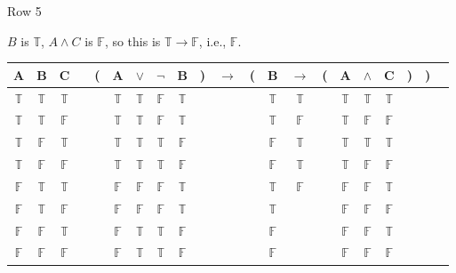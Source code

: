 \documentclass[
  ignorenonframetext,
]{beamer}
\renewcommand{\,}{\text{, }}
\def\True{\mathbb{T}}
\def\False{\mathbb{F}}
\begin{document}
\begin{frame}{Row 5}
\protect\hypertarget{row-5}{}

\(B\) is \(\True\), \(A \wedge C\) is \(\False\), so this is
\(\True \rightarrow \False\), i.e., \(\False\).

\begin{center}
\bigskip
\begin{tabular}{@{ }c@{ }@{ }c@{ }@{ }c | c@{ }@{}c@{}@{ }c@{ }@{ }c@{ }@{ }c@{ }@{ }c@{ }@{}c@{}@{ }c@{ }@{}c@{}@{ }c@{ }@{ }c@{ }@{}c@{}@{ }c@{ }@{ }c@{ }@{ }c@{ }@{}c@{}@{}c@{}@{ }c}
A & B & C &  & ( & A & $\vee$ & $\neg$ & B & ) & $\rightarrow$ & ( & B & $\rightarrow$ & ( & A & $\wedge$ & C & ) & ) & \\
\hline 
 $\True$ & $\True$ & $\True$ &  &  & $\True$ & $\True$ & $\False$ & $\True$ &  &&  & $\True$ & $\True$ &  & $\True$ & $\True$ & $\True$ &  &  & \\
 $\True$ & $\True$ & $\False$ &  &  & $\True$ & $\True$ & $\False$ & $\True$ &  &&  & $\True$ & $\False$ &  & $\True$ & $\False$ & $\False$ &  &  & \\
 $\True$ & $\False$ & $\True$ &  &  & $\True$ & $\True$ & $\True$ & $\False$ &  &&  & $\False$ & $\True$ &  & $\True$ & $\True$ & $\True$ &  &  & \\
 $\True$ & $\False$ & $\False$ &  &  & $\True$ & $\True$ & $\True$ & $\False$ &  &&  & $\False$ & $\True$ &  & $\True$ & $\False$ & $\False$ &  &  & \\
 $\False$ & $\True$ & $\True$ &  &  & $\False$ & $\False$ & $\False$ & $\True$ &  &&  & $\True$ & $\False$ &  & $\False$ & $\False$ & $\True$ &  &  & \\
 $\False$ & $\True$ & $\False$ &  &  & $\False$ & $\False$ & $\False$ & $\True$ &  &&  & $\True$ &&  & $\False$ & $\False$ & $\False$ &  &  & \\
 $\False$ & $\False$ & $\True$ &  &  & $\False$ & $\True$ & $\True$ & $\False$ &  &&  & $\False$ &&  & $\False$ & $\False$ & $\True$ &  &  & \\
 $\False$ & $\False$ & $\False$ &  &  & $\False$ & $\True$ & $\True$ & $\False$ &  &&  & $\False$ &&  & $\False$ & $\False$ & $\False$ &  &  & \\
\end{tabular}
\bigskip
\end{center}

\end{frame}
\end{document}
